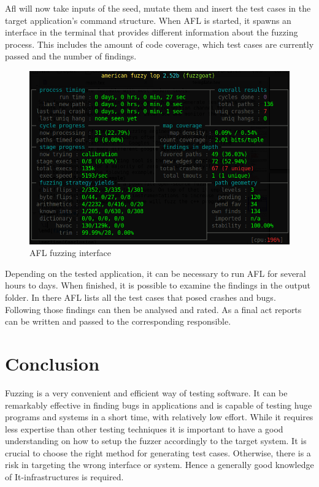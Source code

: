 \documentclass[journal=tosc,final]{iacrtrans}
\begin{document}
Afl will now take inputs of the seed, mutate them and insert the test cases in the target application’s command structure.
When AFL is started, it spawns an interface in the terminal that provides different information about the fuzzing process. This includes the amount of code coverage, which test cases are currently passed and the number of findings. 
\begin{figure}[h]
 \caption{AFL fuzzing interface}
 \begin{center}
   \includegraphics[scale=0.35]{afl.png}

 \end{center}
\end{figure}
\newpage
Depending on the tested application, it can be necessary to run AFL for several hours to days. When finished, it is possible to examine the findings in the output folder. In there AFL lists all the test cases that posed crashes and bugs. Following those findings can then be analysed and rated. As a final act reports can be written and passed to the corresponding responsible.


\section{Conclusion}
Fuzzing is a very convenient and efficient way of testing software. It can be remarkably effective in finding bugs in applications and is capable of testing huge programs and systems in a short time, with relatively low effort. While it requires less expertise than other testing techniques it is important to have a good understanding on how to setup the fuzzer accordingly to the target system. It is crucial to choose the right method for generating test cases. Otherwise, there is a risk in targeting the wrong interface or system. Hence a generally good knowledge of It-infrastructures is required.
\end{document}
